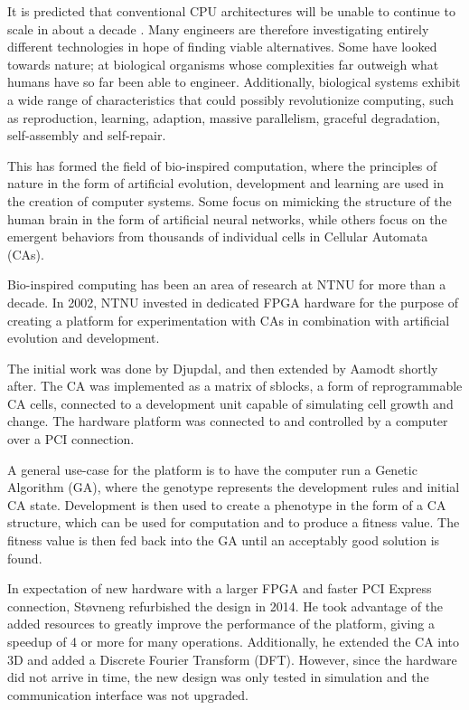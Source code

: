 
It is predicted that conventional CPU architectures will be unable to continue to scale in about a decade \cite{esmaeilzadeh2011end}.
Many engineers are therefore investigating entirely different technologies in hope of finding viable alternatives.
Some have looked towards nature; at biological organisms whose complexities far outweigh what humans have so far been able to engineer.
Additionally, biological systems exhibit a wide range of characteristics that could possibly revolutionize computing, such as reproduction, learning, adaption, massive parallelism, graceful degradation, self-assembly and self-repair.


This has formed the field of bio-inspired computation, where the principles of nature in the form of artificial evolution, development and learning are used in the creation of computer systems.
Some focus on mimicking the structure of the human brain in the form of artificial neural networks\CN, while others focus on the emergent behaviors from thousands of individual cells in Cellular Automata (CAs).


Bio-inspired computing has been an area of research at NTNU for more than a decade.
In 2002, NTNU invested in dedicated FPGA hardware for the purpose of creating a platform for experimentation with CAs in combination with artificial evolution and development.

The initial work was done by Djupdal, and then extended by Aamodt shortly after.
The CA was implemented as a matrix of sblocks, a form of reprogrammable CA cells, connected to a development unit capable of simulating cell growth and change.
The hardware platform was connected to and controlled by a computer over a PCI connection.

A general use-case for the platform is to have the computer run a Genetic Algorithm (GA), where the genotype represents the development rules and initial CA state.
Development is then used to create a phenotype in the form of a CA structure, which can be used for computation and to produce a fitness value.
The fitness value is then fed back into the GA until an acceptably good solution is found.

In expectation of new hardware with a larger FPGA and faster PCI Express connection, Støvneng refurbished the design in 2014.
He took advantage of the added resources to greatly improve the performance of the platform, giving a speedup of 4 or more for many operations.
Additionally, he extended the CA into 3D and added a Discrete Fourier Transform (DFT).
However, since the hardware did not arrive in time, the new design was only tested in simulation and the communication interface was not upgraded.

